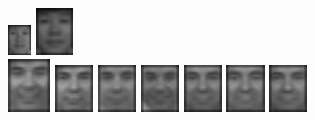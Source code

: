 \begin{figure}[hbt]
  \includegraphics[width=0.055\textwidth]{../results/L_rez/correct95/1/9.jpg}
  \includegraphics[width=0.088\textwidth]{../results/L_rez/correct95/1/10.jpg} \\
  \vspace{4pt}
  \includegraphics[width=0.1\textwidth]{../results/L_rez/correct95/2/testImg.jpg} \vline
  \hspace{2pt}
  \includegraphics[width=0.09\textwidth]{../results/L_rez/correct95/2/1.jpg}
  \includegraphics[width=0.09\textwidth]{../results/L_rez/correct95/2/2.jpg}
  \includegraphics[width=0.09\textwidth]{../results/L_rez/correct95/2/3.jpg}
  \includegraphics[width=0.09\textwidth]{../results/L_rez/correct95/2/4.jpg}
  \includegraphics[width=0.09\textwidth]{../results/L_rez/correct95/2/5.jpg}
  \includegraphics[width=0.09\textwidth]{../results/L_rez/correct95/2/6.jpg}

\end{figure}
